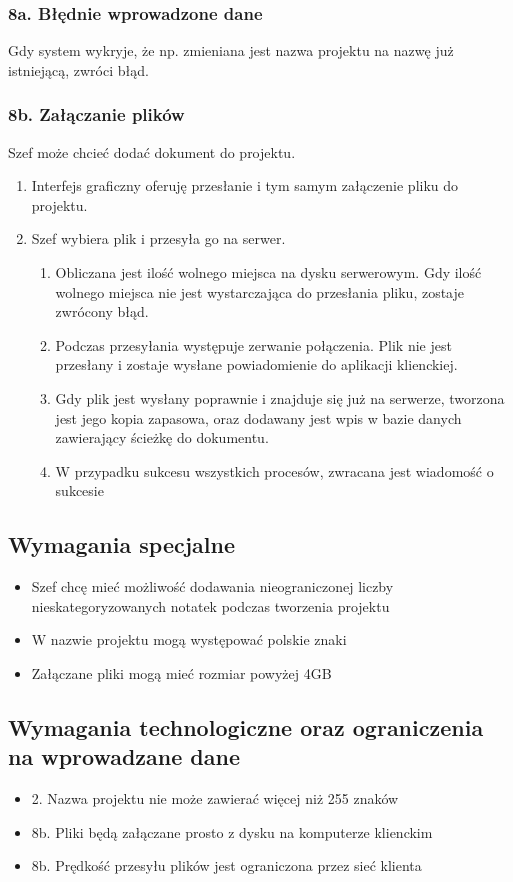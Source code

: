 \documentclass{article}
\begin{document}
    \subsubsection*{8a. Błędnie wprowadzone dane}
    Gdy system wykryje, że np. zmieniana jest nazwa projektu na nazwę już istniejącą, zwróci błąd.

    \subsubsection*{8b. Załączanie plików}
    Szef może chcieć dodać dokument do projektu. 
    \begin{enumerate}
        \item Interfejs graficzny oferuję przesłanie i tym samym załączenie pliku do projektu.
        \item Szef wybiera plik i przesyła go na serwer.
        \begin{enumerate}
            \item Obliczana jest ilość wolnego miejsca na dysku serwerowym. Gdy ilość wolnego miejsca nie jest wystarczająca do przesłania pliku, zostaje zwrócony błąd.
            \item Podczas przesyłania występuje zerwanie połączenia. Plik nie jest przesłany i zostaje wysłane powiadomienie do aplikacji klienckiej.
            \item Gdy plik jest wysłany poprawnie i znajduje się już na serwerze, tworzona jest jego kopia zapasowa, oraz dodawany jest wpis w bazie danych zawierający ścieżkę do dokumentu.
            \item W przypadku sukcesu wszystkich procesów, zwracana jest wiadomość o sukcesie
        \end{enumerate}
    \end{enumerate}

\subsection{Wymagania specjalne}
\begin{itemize}
    \item Szef chcę mieć możliwość dodawania nieograniczonej liczby nieskategoryzowanych notatek podczas tworzenia projektu
    \item W nazwie projektu mogą występować polskie znaki
    \item Załączane pliki mogą mieć rozmiar powyżej 4GB
\end{itemize}

\subsection{Wymagania technologiczne oraz ograniczenia na wprowadzane dane}
\begin{itemize}
    \item 2. Nazwa projektu nie może zawierać więcej niż 255 znaków
    \item 8b. Pliki będą załączane prosto z dysku na komputerze klienckim
    \item 8b. Prędkość przesyłu plików jest ograniczona przez sieć klienta
\end{itemize}
\end{document}
